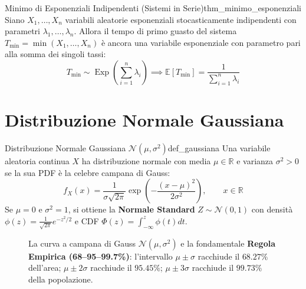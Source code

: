 \begin{teorema}{Minimo di Esponenziali Indipendenti (Sistemi in Serie)}{thm_minimo_esponenziali}
Siano $X_1, \dots, X_n$ variabili aleatorie esponenziali stocasticamente indipendenti con parametri $\lambda_1, \dots, \lambda_n$. Allora il tempo di primo guasto del sistema $T_{\min} = \min(X_1, \dots, X_n)$ è ancora una variabile esponenziale con parametro pari alla somma dei singoli tassi:
\begin{equation}
    T_{\min} \sim \operatorname{Exp}\left(\sum_{i=1}^n \lambda_i\right) \implies \mathbb{E}[T_{\min}] = \frac{1}{\sum_{i=1}^n \lambda_i}
\end{equation}
\end{teorema}

\section{Distribuzione Normale Gaussiana}
\label{sec:gaussiana}

\begin{definizione}{Distribuzione Normale Gaussiana $\mathcal{N}(\mu, \sigma^2)$}{def_gaussiana}
Una variabile aleatoria continua $X$ ha distribuzione normale con media $\mu \in \mathbb{R}$ e varianza $\sigma^2 > 0$ se la sua PDF è la celebre campana di Gauss:
\begin{equation}
    f_X(x) = \frac{1}{\sigma \sqrt{2\pi}} \exp\left( -\frac{(x - \mu)^2}{2\sigma^2} \right), \qquad x \in \mathbb{R}
\end{equation}
Se $\mu = 0$ e $\sigma^2 = 1$, si ottiene la \textbf{Normale Standard} $Z \sim \mathcal{N}(0, 1)$ con densità $\phi(z) = \frac{1}{\sqrt{2\pi}} e^{-z^2/2}$ e CDF $\Phi(z) = \int_{-\infty}^z \phi(t) dt$.
\end{definizione}

\begin{figure}[htbp]
    \centering
    
    \caption{La curva a campana di Gauss $\mathcal{N}(\mu, \sigma^2)$ e la fondamentale \textbf{Regola Empirica (68--95--99.7\%)}: l'intervallo $\mu \pm \sigma$ racchiude il $68.27\%$ dell'area; $\mu \pm 2\sigma$ racchiude il $95.45\%$; $\mu \pm 3\sigma$ racchiude il $99.73\%$ della popolazione.}
    \label{fig:gaussiana_aree}
\end{figure}

